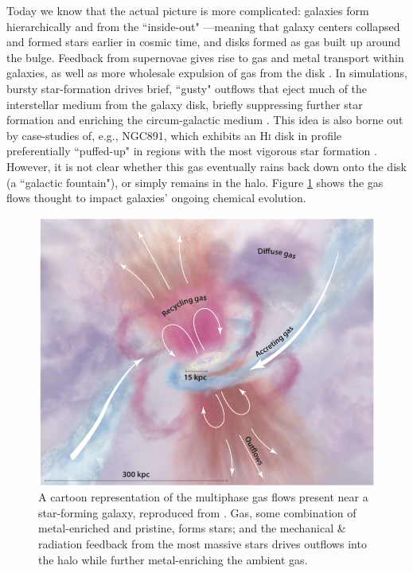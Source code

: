 Today we know that the actual picture is more complicated: galaxies form hierarchically and from the ``inside-out" \citep{wang_kauffmann_11,bovy_16}---meaning that galaxy centers collapsed and formed stars earlier in cosmic time, and disks formed as gas built up around the bulge. Feedback from supernovae gives rise to gas and metal transport within galaxies, as well as more wholesale expulsion of gas from the disk \citep[``galactic winds"][]{veilleux_15_winds}. In simulations, bursty star-formation drives brief, ``gusty" outflows that eject much of the interstellar medium from the galaxy disk, briefly suppressing further star formation and enriching the circum-galactic medium \citep[CGM,][]{muratov_15_gusty}. This idea is also borne out by case-studies of, e.g., NGC891, which exhibits an \textsc{Hi} disk in profile preferentially ``puffed-up" in regions with the most vigorous star formation \citep{oosterloo_07_ngc891}. However, it is not clear whether this gas eventually rains back down onto the disk (a ``galactic fountain"), or simply remains in the halo. Figure \ref{fig:GasFlows} shows the gas flows thought to impact galaxies' ongoing chemical evolution.

\begin{figure}[H]
    \centering
    \includegraphics[width=\textwidth]{gasflows_tumlinson}
    \caption[A cartoon of the multiphase gas flows around galaxies]{\fixspacing A cartoon representation of the multiphase gas flows present near a star-forming galaxy, reproduced from \citet{tumlinson_peeples_werk_CGMreview}. Gas, some combination of metal-enriched and pristine, forms stars; and the mechanical \& radiation feedback from the most massive stars drives outflows into the halo while further metal-enriching the ambient gas.}
	\label{fig:GasFlows}
\end{figure}

